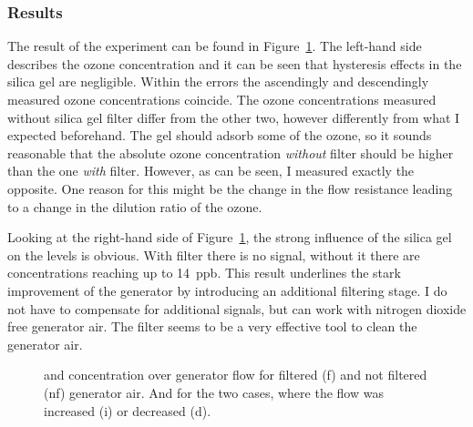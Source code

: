 \subsubsection{Results}
\label{sec:silica-results}

The result of the experiment can be found in
Figure~\ref{fig:o3-flow}. The left-hand side describes the ozone
concentration and it can be seen that hysteresis effects in the silica
gel are negligible. Within the errors the ascendingly and descendingly
measured ozone concentrations coincide. The ozone concentrations
measured without silica gel filter differ from the other two, however
differently from what I expected beforehand. The gel should adsorb
some of the ozone, so it sounds reasonable that the absolute ozone
concentration \emph{without} filter should be higher than the one
\emph{with} filter. However, as can be seen, I measured exactly the
opposite. One reason for this might be the change in the flow
resistance leading to a change in the dilution ratio of the ozone.

Looking at the right-hand side of Figure~\ref{fig:o3-flow}, the
strong influence of the silica gel on the  levels is obvious. With
filter there is no  signal, without it there are concentrations
reaching up to \SI{14}{ppb}. This result underlines the stark
improvement of the generator by introducing an additional filtering
stage. I do not have to compensate for additional  signals,
but can work with nitrogen dioxide free generator air. The filter
seems to be a very effective tool to clean the generator air.

\begin{figure}[htbp]
  \centering
  
  \hfill
  
  \caption{ and  concentration over generator flow for
    filtered (f) and not filtered (nf) generator air. And for the two
    cases, where the flow was increased (i) or decreased (d).}
  \label{fig:o3-flow}
\end{figure}

